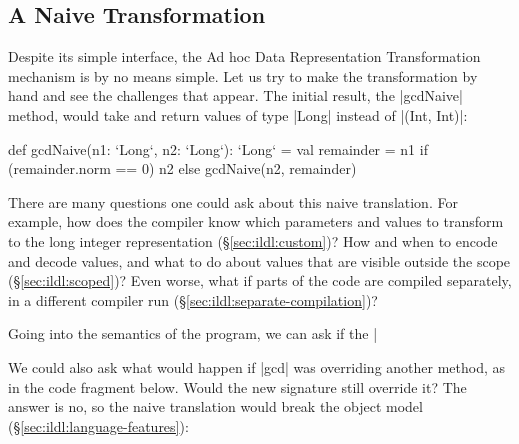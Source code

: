 
\subsection{A Naive Transformation}


Despite its simple interface, the Ad hoc Data Representation Transformation mechanism is by no means simple. Let us try to make the transformation by hand and see the challenges that appear. The initial result, the |gcdNaive| method, would take and return values of type |Long| instead of |(Int, Int)|:

\begin{lstlisting-nobreak}
def gcdNaive(n1: `Long`, n2: `Long`): `Long` = {
  val remainder = n1 %
  if (remainder.norm == 0) n2 else gcdNaive(n2, remainder)
}
\end{lstlisting-nobreak}

There are many questions one could ask about this naive translation. For example, how does the compiler know which parameters and values to transform to the long integer representation (\S\ref{sec:ildl:custom})? How and when to encode and decode values, and what to do about values that are visible outside the scope (\S\ref{sec:ildl:scoped})? Even worse, what if parts of the code are compiled separately, in a different compiler run (\S\ref{sec:ildl:separate-compilation})?

Going into the semantics of the program, we can ask if the |%

We could also ask what would happen if |gcd| was overriding another method, as in the code fragment below. Would the new signature still override it? The answer is no, so the naive translation would break the object model (\S\ref{sec:ildl:language-features}):

